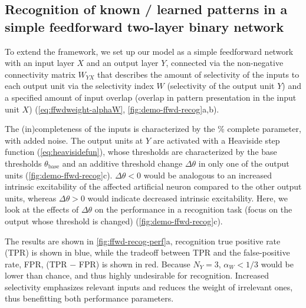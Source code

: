 \subsection{Recognition of known / learned patterns in a simple feedforward two-layer binary network}



To extend the framework, we set up our model as a simple feedforward network
    with an input layer $X$ and an output layer $Y$,
    connected via the non-negative connectivity matrix $W_{YX}$
        that describes the amount of selectivity of the inputs to each output unit via
            the selectivity index $W$ (selectivity of the output unit $Y$)
            and a specified amount of input overlap (overlap in pattern presentation in the input unit $X$)
            (\autoref{eq:ffwdweight-alphaW}, \autoref{fig:demo-ffwd-recog}a,b).

The (in)completeness of the inputs is characterized by
        the \% complete parameter, with added noise.
    The output units at $Y$ are activated with a Heaviside step function (\autoref{eq:heavisidefun}), whose thresholds are characterized by
        the base thresholds $\theta_{\text{base}}$
        and an additive threshold change $\Delta \theta$ in only one of the output units (\autoref{fig:demo-ffwd-recog}c).
    $\Delta \theta < 0$ would be analogous to an increased intrinsic excitability of the affected artificial neuron compared to the other output units,
        whereas $\Delta \theta > 0$ would indicate decreased intrinsic excitability.
    Here, we look at the effects of $\Delta \theta$ on the performance in a recognition task
        (focus on the output whose threshold is changed) (\autoref{fig:demo-ffwd-recog}c).



The results are shown in \autoref{fig:ffwd-recog-perf}a,
        recognition true positive rate (TPR) is shown in blue,
        while the tradeoff between TPR and the false-positive rate, FPR, (TPR $-$ FPR) is shown in red.
    Because $N_Y=3$, $\alpha_W < 1/3$ would be lower than chance,
        and thus highly undesirable for recognition.
    Increased selectivity emphasizes relevant inputs and reduces the weight of irrelevant ones, thus benefitting both performance parameters.

